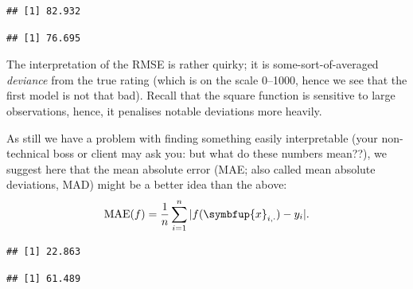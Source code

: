 \documentclass[10pt,b5paper,krantz1]{krantz}
\newenvironment{Shaded}{\begin{snugshade}}{\end{snugshade}}
\newcommand{\DecValTok}[1]{\textcolor[rgb]{0.06,0.06,0.06}{#1}}
\newcommand{\KeywordTok}[1]{\textcolor[rgb]{0.27,0.27,0.27}{\textbf{#1}}}
\newcommand{\NormalTok}[1]{#1}
\newcommand{\OperatorTok}[1]{\textcolor[rgb]{0.43,0.43,0.43}{\textbf{#1}}}
\renewcommand{\mathbf}[1]{\symbfup{#1}}
\begin{document}
\begin{verbatim}
## [1] 82.932
\end{verbatim}

\begin{Shaded}
\end{Shaded}

\begin{verbatim}
## [1] 76.695
\end{verbatim}

The interpretation of the RMSE is rather quirky;
it is some-sort-of-averaged \emph{deviance} from the true rating
(which is on the scale 0--1000, hence we see that the first model is not
that bad). Recall that the square function is sensitive to large observations,
hence, it penalises notable deviations more heavily.

As still we have a problem with finding something easily interpretable
(your non-technical boss or client may ask you: but what do these numbers mean??),
we suggest here that the mean absolute error (MAE;
also called mean absolute deviations, MAD)
might be a better idea than the above:
\[
 \mathrm{MAE}(f) = \frac{1}{n} \sum_{i=1}^n |f(\mathbf{x}_{i,\cdot})-y_i|.
\]

\begin{Shaded}
\end{Shaded}

\begin{verbatim}
## [1] 22.863
\end{verbatim}

\begin{Shaded}
\end{Shaded}

\begin{verbatim}
## [1] 61.489
\end{verbatim}

\begin{Shaded}
\end{Shaded}
\end{document}
